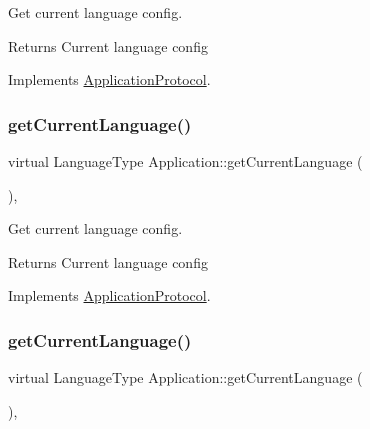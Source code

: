 Get current language config. 

\begin{DoxyReturn}{Returns}
Current language config 
\end{DoxyReturn}


Implements \hyperlink{classApplicationProtocol_a44034ed02f9dd0fc59264f74f9ef9b17}{Application\+Protocol}.

\mbox{\label{classApplication_ac972f15de44614b03604fb4e3e05cab3}} 
\subsubsection{\texorpdfstring{get\+Current\+Language()}{getCurrentLanguage()}\hspace{0.1cm}{\footnotesize\ttfamily [11/12]}}
{\footnotesize\ttfamily virtual Language\+Type Application\+::get\+Current\+Language (\begin{DoxyParamCaption}{ }\end{DoxyParamCaption})\hspace{0.3cm}{\ttfamily [override]}, {\ttfamily [virtual]}}



Get current language config. 

\begin{DoxyReturn}{Returns}
Current language config 
\end{DoxyReturn}


Implements \hyperlink{classApplicationProtocol_a44034ed02f9dd0fc59264f74f9ef9b17}{Application\+Protocol}.

\mbox{\label{classApplication_ac972f15de44614b03604fb4e3e05cab3}} 
\subsubsection{\texorpdfstring{get\+Current\+Language()}{getCurrentLanguage()}\hspace{0.1cm}{\footnotesize\ttfamily [12/12]}}
{\footnotesize\ttfamily virtual Language\+Type Application\+::get\+Current\+Language (\begin{DoxyParamCaption}{ }\end{DoxyParamCaption})\hspace{0.3cm}{\ttfamily [override]}, {\ttfamily [virtual]}}



